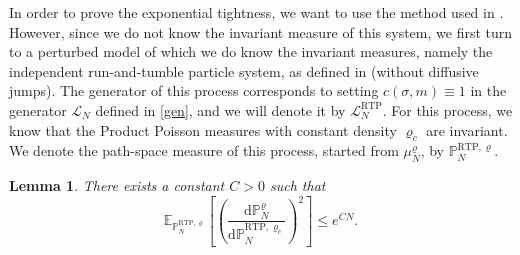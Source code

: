 \documentclass[11pt]{article}
\numberwithin{equation}{section}
\theoremstyle{definition}
\theoremstyle{plain}
\newtheorem{Lemma}[Theorem]{Lemma}
\newcommand{\E}{\mathbb{E}}
\newcommand{\p}{\mathbb{P}}
\newcommand{\dd}{\mathrm{d}}
\newcommand{\RTP}{\mathrm{RTP}}
\begin{document}
 In order to prove the exponential tightness, we want to use the method used in \cite[pages 271-273]{KipnisLandim}. However, since we do not know the invariant measure of this system, we first turn to a perturbed model of which we do know the invariant measures, namely the independent run-and-tumble particle system, as defined in \cite{Hidde-Fluctuations} (without diffusive jumps). The generator of this process corresponds to setting $c(\sigma,m) \equiv 1$ in the generator $\mathscr{L}_N$ defined in \eqref{gen}, and we will denote it by $\mathscr{L}_N^{\RTP}$. For this process, we know that the Product Poisson measures with constant density $\varrho_c$ are invariant. We denote the path-space measure of this process, started from $\mu^\varrho_N$, by $\p^{\RTP,\varrho}_{N}$. 
    \begin{Lemma}\label{radon bound}
    There exists a constant $C>0$ such that
        \begin{equation}\label{radon rtp}
            \E_{\p^{\RTP,\varrho}_N}\left[\left(\frac{\dd\p^{\varrho}_N}{\dd \p^{\RTP,\varrho_c}_N} \right)^2\right]\leq e^{CN}.
        \end{equation}
    \end{Lemma}
\end{document}
